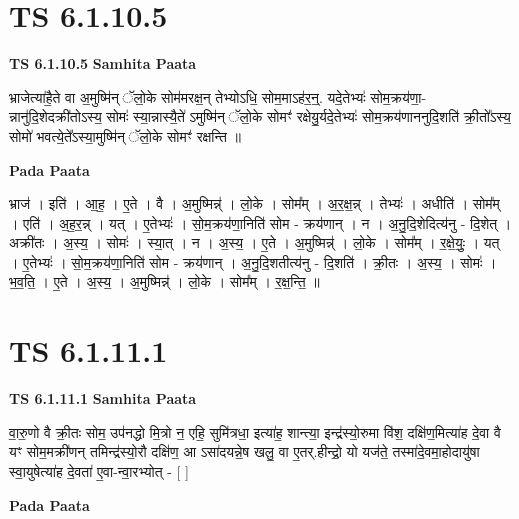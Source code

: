 \documentclass[17pt]{extarticle}
\begin{document}

\section{ TS 6.1.10.5 }

\textbf{TS 6.1.10.5 } \newline
\textbf{Samhita Paata} \newline

भ्राजेत्या॑है॒ते वा अ॒मुष्मि॑न् ॅलो॒के सोम॑मरक्ष॒न् तेभ्योऽधि॒ सोम॒माऽह॑र॒न्॒. यदे॒तेभ्यः॑ सोम॒क्रय॑णा॒-न्नानु॑दि॒शेदक्री॑तोऽस्य॒ सोमः॑ स्या॒न्नास्यै॒ते॑ ऽमुष्मि॑न् ॅलो॒के सोमꣳ॑ रक्षेयु॒र्यदे॒तेभ्यः॑ सोम॒क्रय॑णाननुदि॒शति॑ क्री॒तो᳚ऽस्य॒ सोमो॑ भवत्ये॒ते᳚ऽस्या॒मुष्मि॑न् ॅलो॒के सोमꣳ॑ रक्षन्ति ॥ \newline

\textbf{Pada Paata} \newline

भ्राज॑ । इति॑ । आ॒ह॒ । ए॒ते । वै । अ॒मुष्मिन्न्॑ । लो॒के । सोम᳚म् । अ॒र॒क्ष॒न्न् । तेभ्यः॑ । अधीति॑ । सोम᳚म् । एति॑ । अ॒ह॒र॒न्न् । यत् । ए॒तेभ्यः॑ । सो॒म॒क्रय॑णा॒निति॑ सोम - क्रय॑णान् । न । अ॒नु॒दि॒शेदित्य॑नु - दि॒शेत् । अक्री॑तः । अ॒स्य॒ । सोमः॑ । स्या॒त् । न । अ॒स्य॒ । ए॒ते । अ॒मुष्मिन्न्॑ । लो॒के । सोम᳚म् । र॒क्षे॒युः॒ । यत् । ए॒तेभ्यः॑ । सो॒म॒क्रय॑णा॒निति॑ सोम - क्रय॑णान् । अ॒नु॒दि॒शतीत्य॑नु - दि॒शति॑ । क्री॒तः । अ॒स्य॒ । सोमः॑ । भ॒व॒ति॒ । ए॒ते । अ॒स्य॒ । अ॒मुष्मिन्न्॑ । लो॒के । सोम᳚म् । र॒क्ष॒न्ति॒ ॥  \newline





\section{ TS 6.1.11.1 }

\textbf{TS 6.1.11.1 } \newline
\textbf{Samhita Paata} \newline

वा॒रु॒णो वै क्री॒तः सोम॒ उप॑नद्धो मि॒त्रो न॒ एहि॒ सुमि॑त्रधा॒ इत्या॑ह॒ शान्त्या॒ इन्द्र॑स्यो॒रुमा वि॑श॒ दक्षि॑ण॒मित्या॑ह दे॒वा वै यꣳ सोम॒मक्री॑णन् तमिन्द्र॑स्यो॒रौ दक्षि॑ण॒ आ ऽसा॑दयन्ने॒ष खलु॒ वा ए॒तर्.हीन्द्रो॒ यो यज॑ते॒ तस्मा॑दे॒वमा॒होदायु॑षा स्वा॒युषेत्या॑ह दे॒वता॑ ए॒वा-न्वा॒रभ्योत् - [  ] \newline

\textbf{Pada Paata} \newline
\end{document}
